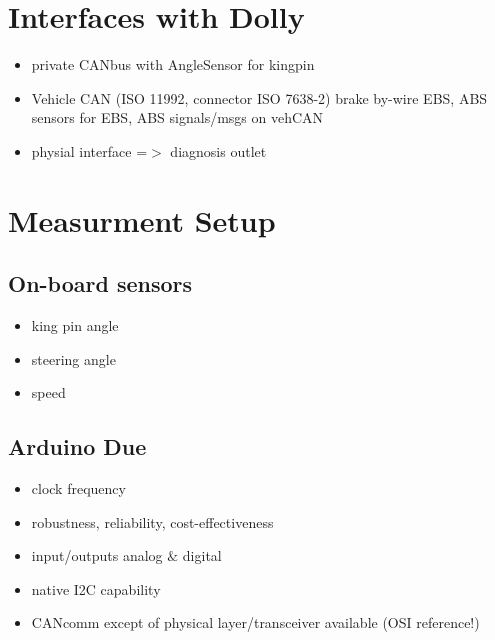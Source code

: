 \documentclass[ExampleMasters.tex]{subfiles}
\begin{document}
\section{Interfaces with Dolly}
\label{sec:interface_with_dolly}

\begin{itemize}
	\item private CANbus with AngleSensor for kingpin
	\item Vehicle CAN (ISO 11992, connector ISO 7638-2)
	\subitem brake by-wire
	\subitem EBS, ABS
	\subitem sensors for EBS, ABS
	\subitem signals/msgs on vehCAN
	\item physial interface =$>$ diagnosis outlet
\end{itemize}

\section{Measurment Setup}
\label{sec:measurement_setup}

\subsection{On-board sensors}
\begin{itemize}
	\item king pin angle
	\item steering angle 
	\item speed
\end{itemize}

\subsection{Arduino Due}
\label{sec:arduino}
\begin{itemize}
	\item clock frequency
	\item robustness, reliability, cost-effectiveness
	\item input/outputs analog $\&$ digital
	\item native I2C capability
	\item CANcomm except of physical layer/transceiver available (OSI reference!)
\end{itemize}
\end{document}
